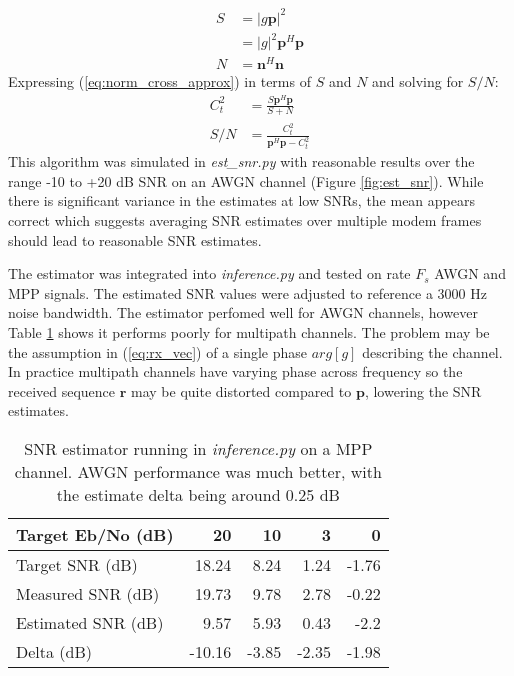 \documentclass{article}
\begin{document}
\begin{equation}
\begin{split}
S &= |g\bm{p}|^2 \\
  &= |g|^2 \bm{p}^H\bm{p} \\
N &= \bm{n}^H\bm{n}
\end{split}
\end{equation}
Expressing (\ref{eq:norm_cross_approx}) in terms of $S$ and $N$ and solving for $S/N$:
\begin{equation}
\begin{split}
C_t^2 &= \frac{S \bm{p}^H\bm{p}}{S + N} \\
S/N &= \frac{C_t^2}{ \bm{p}^H\bm{p} - C_t^2}
\end{split}
\end{equation}
This algorithm was simulated in \emph{est\_snr.py} with reasonable results over the range -10 to +20 dB SNR on an AWGN channel (Figure \ref{fig:est_snr}).  While there is significant variance in the estimates at low SNRs, the mean appears correct which suggests averaging SNR estimates over multiple modem frames should lead to reasonable SNR estimates.

The estimator was integrated into \emph{inference.py} and tested on rate $F_s$ AWGN and MPP signals. The estimated SNR values were adjusted to reference a 3000 Hz noise bandwidth. The estimator perfomed well for AWGN channels, however Table \ref{tab:snr_est_results} shows it performs poorly for multipath channels.  The problem may be the assumption in (\ref{eq:rx_vec}) of a single phase $arg[g]$ describing the channel.  In practice multipath channels have varying phase across frequency so the received sequence $\bm{r}$ may be quite distorted compared to $\bm{p}$, lowering the SNR estimates.

\begin{table} [H]
\centering
\begin{tabular}{l r r r r}
 \hline
 Target Eb/No (dB)  & 20 & 10 & 3 & 0 \\
 \hline
 Target SNR (dB)    & 18.24 & 8.24 & 1.24 & -1.76  \\
 Measured SNR (dB)  & 19.73 & 9.78 & 2.78 & -0.22 \\
 Estimated SNR (dB) &  9.57 & 5.93 & 0.43 & -2.2 \\
 Delta (dB)         & -10.16 & -3.85 & -2.35 & -1.98 \\
 \hline
\end{tabular}
\caption{SNR estimator running in \emph{inference.py} on a MPP channel. AWGN performance was much better, with the estimate delta being around 0.25 dB}
\label{tab:snr_est_results}
\end{table}
\end{document}
